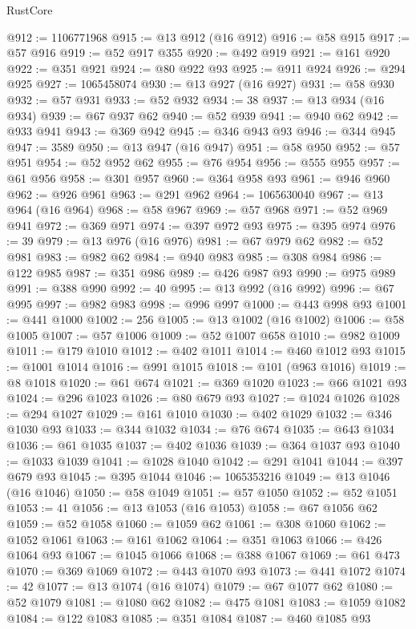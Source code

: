\begin{lexlean}{RustCore}
\begin{coremodule}
@912 := 1106771968
@915 := @13 @912 (@16 @912)
@916 := @58 @915
@917 := @57 @916
@919 := @52 @917 @355
@920 := @492 @919
@921 := @161 @920
@922 := @351 @921
@924 := @80 @922 @93
@925 := @911 @924
@926 := @294 @925
@927 := 1065458074
@930 := @13 @927 (@16 @927)
@931 := @58 @930
@932 := @57 @931
@933 := @52 @932
@934 := 38
@937 := @13 @934 (@16 @934)
@939 := @67 @937 @62
@940 := @52 @939
@941 := @940 @62
@942 := @933 @941
@943 := @369 @942
@945 := @346 @943 @93
@946 := @344 @945
@947 := 3589
@950 := @13 @947 (@16 @947)
@951 := @58 @950
@952 := @57 @951
@954 := @52 @952 @62
@955 := @76 @954
@956 := @555 @955
@957 := @61 @956
@958 := @301 @957
@960 := @364 @958 @93
@961 := @946 @960
@962 := @926 @961
@963 := @291 @962
@964 := 1065630040
@967 := @13 @964 (@16 @964)
@968 := @58 @967
@969 := @57 @968
@971 := @52 @969 @941
@972 := @369 @971
@974 := @397 @972 @93
@975 := @395 @974
@976 := 39
@979 := @13 @976 (@16 @976)
@981 := @67 @979 @62
@982 := @52 @981
@983 := @982 @62
@984 := @940 @983
@985 := @308 @984
@986 := @122 @985
@987 := @351 @986
@989 := @426 @987 @93
@990 := @975 @989
@991 := @388 @990
@992 := 40
@995 := @13 @992 (@16 @992)
@996 := @67 @995
@997 := @982 @983
@998 := @996 @997
@1000 := @443 @998 @93
@1001 := @441 @1000
@1002 := 256
@1005 := @13 @1002 (@16 @1002)
@1006 := @58 @1005
@1007 := @57 @1006
@1009 := @52 @1007 @658
@1010 := @982 @1009
@1011 := @179 @1010
@1012 := @402 @1011
@1014 := @460 @1012 @93
@1015 := @1001 @1014
@1016 := @991 @1015
@1018 := @101 (@963 @1016)
@1019 := @8 @1018
@1020 := @61 @674
@1021 := @369 @1020
@1023 := @66 @1021 @93
@1024 := @296 @1023
@1026 := @80 @679 @93
@1027 := @1024 @1026
@1028 := @294 @1027
@1029 := @161 @1010
@1030 := @402 @1029
@1032 := @346 @1030 @93
@1033 := @344 @1032
@1034 := @76 @674
@1035 := @643 @1034
@1036 := @61 @1035
@1037 := @402 @1036
@1039 := @364 @1037 @93
@1040 := @1033 @1039
@1041 := @1028 @1040
@1042 := @291 @1041
@1044 := @397 @679 @93
@1045 := @395 @1044
@1046 := 1065353216
@1049 := @13 @1046 (@16 @1046)
@1050 := @58 @1049
@1051 := @57 @1050
@1052 := @52 @1051
@1053 := 41
@1056 := @13 @1053 (@16 @1053)
@1058 := @67 @1056 @62
@1059 := @52 @1058
@1060 := @1059 @62
@1061 := @308 @1060
@1062 := @1052 @1061
@1063 := @161 @1062
@1064 := @351 @1063
@1066 := @426 @1064 @93
@1067 := @1045 @1066
@1068 := @388 @1067
@1069 := @61 @473
@1070 := @369 @1069
@1072 := @443 @1070 @93
@1073 := @441 @1072
@1074 := 42
@1077 := @13 @1074 (@16 @1074)
@1079 := @67 @1077 @62
@1080 := @52 @1079
@1081 := @1080 @62
@1082 := @475 @1081
@1083 := @1059 @1082
@1084 := @122 @1083
@1085 := @351 @1084
@1087 := @460 @1085 @93

\end{coremodule}
\end{lexlean}
